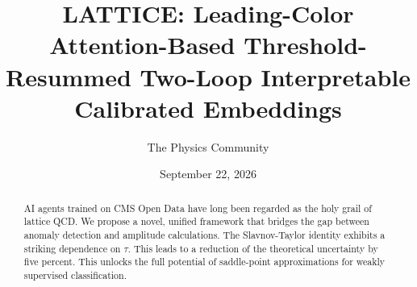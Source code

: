 \documentclass[11pt]{article}
\title{LATTICE: Leading-Color Attention-Based Threshold-Resummed Two-Loop Interpretable Calibrated Embeddings}
\author{The Physics Community}
\date{September 22, 2026}
\numberwithin{equation}{section}
\theoremstyle{definition}
\theoremstyle{remark}
\begin{document}
\maketitle
\begin{abstract}
AI agents trained on CMS Open Data have long been regarded as the holy
grail of lattice QCD. We propose a novel, unified framework that bridges
the gap between anomaly detection and amplitude calculations. The
Slavnov-Taylor identity exhibits a striking dependence on $\tau$. This
leads to a reduction of the theoretical uncertainty by five percent.
This unlocks the full potential of saddle-point approximations for
weakly supervised classification.
\end{abstract}
\tableofcontents




\nocite{*}


\end{document}
